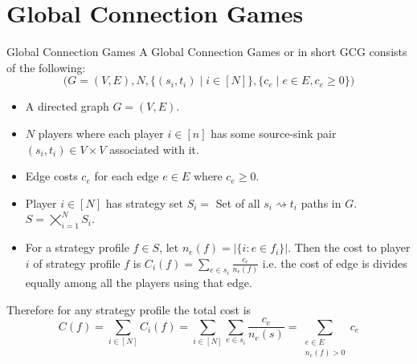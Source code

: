 \section{Global Connection Games}
\begin{definition}{Global Connection Games}{}
	A Global Connection Games or in short GCG consists of the following:$$\Big(G=(V,E),N,\{(s_i,t_i)\mid i\in[N]\}, \{c_e \mid e\in E,c_e\geq 0\}\Big)$$
	\begin{itemize}[itemsep=-1mm]
		\item A directed graph $G=(V,E)$.
		\item $N$ players where  each player $i\in[n]$ has some source-sink pair $(s_i,t_i)\in V\times V$ associated with it.
		\item Edge costs $c_e$ for each edge $e\in E$ where $c_e\geq 0$.
		\item Player $i\in[N]$ has strategy set $S_i=$ Set of all $s_i\rightsquigarrow t_i$ paths in $G$. $S=\bigtimes\limits_{i=1}^N S_i$.
		\item For a strategy profile $f\in S$, let $n_e(f)=|\{i\colon e\in f_i\}|$. Then the cost to player $i$ of strategy profile $f$ is $C_i(f)=\sum\limits_{e\in s_i}\frac{c_e}{n_e(f)}$ i.e. the cost of edge is divides equally among all the players using that edge.
	\end{itemize}
\end{definition}

Therefore for any strategy profile the total cost is $$C(f)=\sum\limits_{i\in[N]}C_i(f)=\sum\limits_{i\in[N]}\sum\limits_{e\in s_i}\frac{c_e}{n_e(s)}=\sum\limits_{\substack{e\in E\\ n_e(f)>0}}c_e$$

